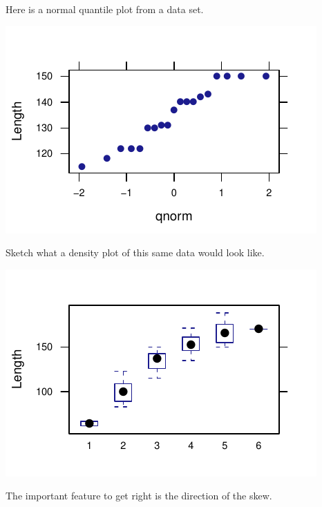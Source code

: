 \documentclass[twoside]{book}\usepackage[]{graphicx}\usepackage[]{xcolor}
\makeatletter
\def\maxwidth{ %
  \ifdim\Gin@nat@width>\linewidth
    \linewidth
  \else
    \Gin@nat@width
  \fi
}
\newenvironment{knitrout}{}{} %
\makeatother
\begin{document}
\begin{problem}
Here is a normal quantile plot from a data set.
\begin{knitrout}
\color{fgcolor}

{\centering \includegraphics[width=\maxwidth]{figures/fig-unnamed-chunk-153-1} 

}



\end{knitrout}
Sketch what a density plot of this same data would look like.
\end{problem}

\begin{solution}
\begin{knitrout}
\color{fgcolor}

{\centering \includegraphics[width=\maxwidth]{figures/fig-unnamed-chunk-154-1} 

}



\end{knitrout}
The important feature to get right is the direction of the skew.
\end{solution}
\end{document}
